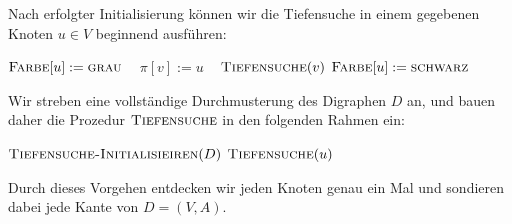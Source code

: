 \begin{bem} Nach erfolgter Initialisierung können wir die Tiefensuche in einem gegebenen Knoten $u \in V$ beginnend ausführen:
\begin{algorithm}[H]
\caption{$\cc{Tiefensuche}(u)$}
\begin{algorithmic}[1]
 \STATE $\mathop{\text{\textsc{Farbe}}}[u]:=\mathop{\text{\textsc{grau}}}$ \  		 
  \STATE  {}
   \STATE $\pi[v]:=u$   \  
   \STATE $\mathop{\text{\textsc{Tiefensuche}}}(v)$
  \ENDIF
 \ENDFOR
 \STATE $\mathop{\text{\textsc{Farbe}}}[u]:=\mathop{\text{\textsc{schwarz}}}$ 
\end{algorithmic}
\end{algorithm}
\end{bem}

\begin{bem} 
Wir streben eine vollständige Durchmusterung des Digraphen $D$ an, und bauen daher die Prozedur $\mathop{\text{\textsc{Tiefensuche}}}$ in den folgenden Rahmen ein:
\begin{algorithm}[H]
\caption{$\cc{Vollständige-Tiefensuche}(D)$}
\begin{algorithmic}[1]
 \STATE $\mathop{\text{\textsc{Tiefensuche-Initialisieiren}}}(D)$ 
 \label{line:tiefensuche-hauptschleife-start}
   \STATE $\cc{Tiefensuche}(u)$
  \ENDIF 
 \ENDFOR\label{line:tiefensuche-hauptschleife-ende}
\end{algorithmic}
\end{algorithm}

\noindent Durch dieses Vorgehen entdecken wir jeden Knoten genau ein Mal und sondieren dabei jede Kante von $D=(V,A)$. 
\end{bem}




